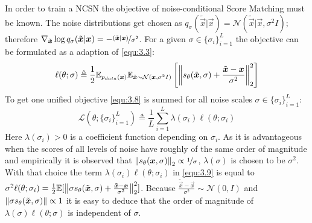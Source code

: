 In order to train a NCSN the objective of noise-conditional Score Matching must be known. The noise distributions get chosen as $q_\sigma(\tilde{\vec{x}}|\vec{x})=\mathcal{N}(\tilde{\vec{x}}|\vec{x},\sigma^2I)$; therefore $\nabla_{\tilde{\vec{x}}}\log q_\sigma(\tilde{\vec{x}}|\vec{x})=-\nicefrac{(\tilde{\vec{x}}|\vec{x})}{\sigma^2}$. For a given $\sigma\in\{\sigma_i\}_{i=1}^L$ the objective can be formulated as a adaption of \cref{equ:3.3}:
%
\begin{equation} \label{equ:3.8}
    \ell(\theta; \sigma)\triangleq\frac{1}{2}\mathbb{E}_{p_{data}(\vec{x})}\mathbb{E}_{\tilde{\vec{x}}\sim\mathcal{N}(\vec{x},\sigma^2I)}\left[\norm{s_\theta(\tilde{\vec{x}},\sigma)+\frac{\tilde{\vec{x}}-\vec{x}}{\sigma^2}}_2^2\right]
\end{equation}
% 
To get one unified objective \cref{equ:3.8} is summed for all noise scales $\sigma\in\{\sigma_i\}_{i=1}^L$:
%
\begin{equation} \label{equ:3.9}
    \mathcal{L}(\theta;\{\sigma_i\}_{i=1}^L)\triangleq\frac{1}{L}\sum_{i=1}^L\lambda(\sigma_i)\ell(\theta;\sigma_i)
\end{equation}
%
Here $\lambda(\sigma_i)>0$ is a coefficient function depending on $\sigma_i$. As it is advantageous when the scores of all levels of noise have roughly of the same order of magnitude and empirically it is observed that $\norm{s_\theta(\vec{x},\sigma)}_2\propto\nicefrac{1}{\sigma}$, $\lambda(\sigma)$ is chosen to be $\sigma^2$. With that choice the term $\lambda(\sigma_i)\ell(\theta;\sigma_i)$ in \cref{equ:3.9} is equal to $\sigma^2\ell(\theta;\sigma_i)=\frac{1}{2}\mathbb{E}[\norm{\sigma s_\theta(\tilde{\vec{x}},\sigma)+\frac{\tilde{\vec{x}}-\vec{x}}{\sigma^2}}_2^2]$. Because $\frac{\tilde{\vec{x}}-\vec{x}}{\sigma^2}\sim\mathcal{N}(0, I)$ and $\norm{\sigma s_\theta(\tilde{\vec{x}},\sigma)}\propto1$ it is easy to deduce that the order of magnitude of $\lambda(\sigma)\ell(\theta;\sigma)$ is independent of $\sigma$.
%
